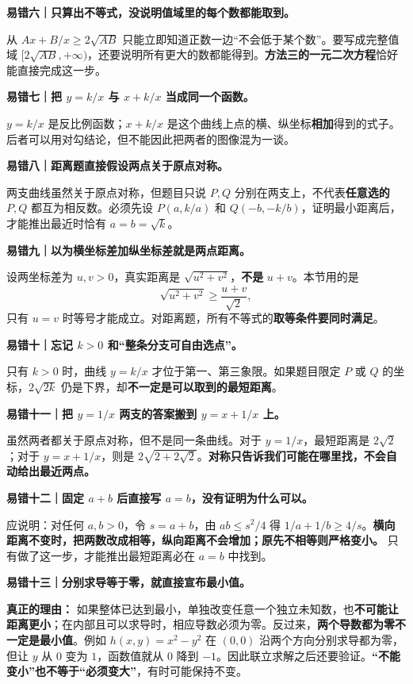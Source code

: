 \begin{trapbox}
\textbf{易错六｜只算出不等式，没说明值域里的每个数都能取到。}

从 $Ax+B/x\ge2\sqrt{AB}$ 只能立即知道正数一边“不会低于某个数”。要写成完整值域 $[2\sqrt{AB},+\infty)$，还要说明所有更大的数都能得到。\textbf{方法三的一元二次方程}恰好能直接完成这一步。

\medskip
\textbf{易错七｜把 $y=k/x$ 与 $x+k/x$ 当成同一个函数。}

$y=k/x$ 是反比例函数；$x+k/x$ 是这个曲线上点的横、纵坐标\textbf{相加}得到的式子。后者可以用对勾结论，但不能因此把两者的图像混为一谈。

\medskip
\textbf{易错八｜距离题直接假设两点关于原点对称。}

两支曲线虽然关于原点对称，但题目只说 $P,Q$ 分别在两支上，不代表\textbf{任意选的} $P,Q$ 都互为相反数。必须先设 $P(a,k/a)$ 和 $Q(-b,-k/b)$，证明最小距离后，才能推出最近时恰有 $a=b=\sqrt{k}$。

\medskip
\textbf{易错九｜以为横坐标差加纵坐标差就是两点距离。}

设两坐标差为 $u,v>0$，真实距离是 $\sqrt{u^2+v^2}$，\textbf{不是} $u+v$。本节用的是
\[
\sqrt{u^2+v^2}\ge\frac{u+v}{\sqrt2},
\]
只有 $u=v$ 时等号才能成立。对距离题，所有不等式的\textbf{取等条件要同时满足}。

\medskip
\textbf{易错十｜忘记 $k>0$ 和“整条分支可自由选点”。}

只有 $k>0$ 时，曲线 $y=k/x$ 才位于第一、第三象限。如果题目限定 $P$ 或 $Q$ 的坐标，$2\sqrt{2k}$ 仍是下界，却\textbf{不一定是可以取到的最短距离}。


\medskip
\textbf{易错十一｜把 $y=1/x$ 两支的答案搬到 $y=x+1/x$ 上。}

虽然两者都关于原点对称，但不是同一条曲线。对于 $y=1/x$，最短距离是 $2\sqrt2$；对于 $y=x+1/x$，则是 $2\sqrt{2+2\sqrt2}$。\textbf{对称只告诉我们可能在哪里找，不会自动给出最近两点。}

\medskip
\textbf{易错十二｜固定 $a+b$ 后直接写 $a=b$，没有证明为什么可以。}

应说明：对任何 $a,b>0$，令 $s=a+b$，由 $ab\le s^2/4$ 得 $1/a+1/b\ge4/s$。\textbf{横向距离不变时，把两数改成相等，纵向距离不会增加；原先不相等则严格变小。} 只有做了这一步，才能推出最短距离必在 $a=b$ 中找到。

\medskip
\textbf{易错十三｜分别求导等于零，就直接宣布最小值。}

\textbf{真正的理由：} 如果整体已达到最小，单独改变任意一个独立未知数，也\textbf{不可能让距离更小}；在内部且可以求导时，相应导数必须为零。反过来，\textbf{两个导数都为零不一定是最小值}。例如 $h(x,y)=x^2-y^2$ 在 $(0,0)$ 沿两个方向分别求导都为零，但让 $y$ 从 $0$ 变为 $1$，函数值就从 $0$ 降到 $-1$。因此联立求解之后还要验证。\textbf{“不能变小”也不等于“必须变大”}，有时可能保持不变。
\end{trapbox}
